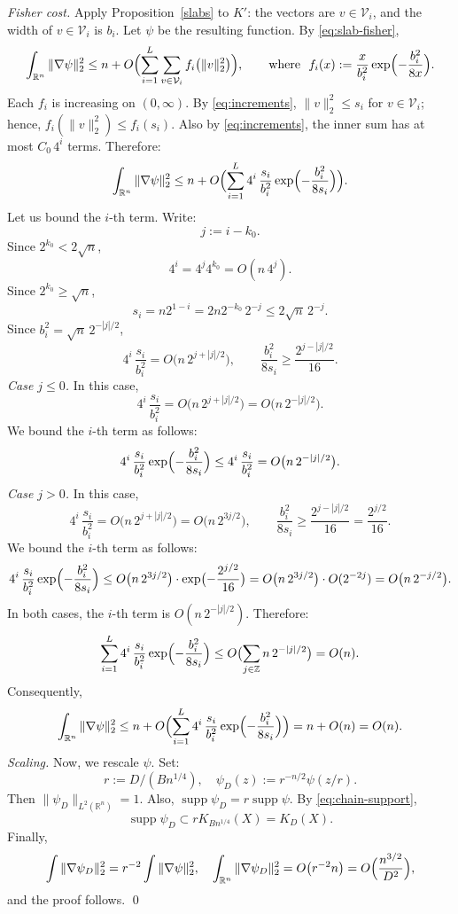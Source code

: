 \documentclass[12pt,reqno]{amsart}
\makeatletter
\renewenvironment{proof}[1][\proofname]{%
  \par\vspace{\topsep}%
  \normalfont\topsep6\p@\@plus6\p@\relax
  \trivlist
  \item[\hskip\labelsep\itshape #1\@addpunct{.}]\ignorespaces
}{%
  \endtrivlist
}
\numberwithin{equation}{section}
\def \R {\mathbb{R}}
\makeatother
\begin{document}
\begin{proof}
\emph{Fisher cost.} Apply Proposition~\ref{slabs} to \(K'\): the vectors are \(v\in\mathcal V_i\), and the width of \(v\in\mathcal V_i\) is \(b_i\). Let \(\psi\) be the resulting function. By \eqref{eq:slab-fisher},
\[
\int_{\R^n}\|\nabla\psi\|_2^2\le
n+O\Bigl(\sum_{i=1}^L\sum_{v\in\mathcal V_i}f_i\bigl(\|v\|_2^2\bigr)\Bigr),
\qquad\text{where }\ f_i(x):=\frac{x}{b_i^2}\exp\Bigl(-\frac{b_i^2}{8x}\Bigr).
\]
Each \(f_i\) is increasing on \((0,\infty)\). By \eqref{eq:increments}, \(\|v\|_2^2\le s_i\) for \(v\in\mathcal V_i\); hence, \(f_i(\|v\|_2^2)\le f_i(s_i)\). Also by \eqref{eq:increments}, the inner sum has at most \(C_0\,4^i\) terms. Therefore:
\[
\int_{\R^n}\|\nabla\psi\|_2^2\le
n+O\Bigl(\sum_{i=1}^L4^i\,\frac{s_i}{b_i^2}\exp\Bigl(-\frac{b_i^2}{8s_i}\Bigr)\Bigr).
\]
Let us bound 
the \(i\)-th term. Write: 
\[
j:=i-k_0.
\] 
Since \(2^{k_0}<2\sqrt n\), 
\[
4^{i} = 4^{j} 4^{k_0} = O(n\,4^j).
\]
Since \(2^{k_0}\ge\sqrt n\), 
\[
s_i= n 2^{1-i} = 2n2^{-k_0}\,2^{-j}\le2\sqrt n\,2^{-j}.
\]
Since \(b_i^2=\sqrt n\,2^{-|j|/2}\),
\[
4^i\,\frac{s_i}{b_i^2}=O\bigl(n\,2^{j+|j|/2}\bigr),\qquad
\frac{b_i^2}{8s_i}\ge\frac{2^{j-|j|/2}}{16}.
\]
\emph{Case \(j \le 0\).} In this case, 
\[
4^i\,\frac{s_i}{b_i^2} = 
O\bigl(n\,2^{j+|j|/2}\bigr) = 
O\bigl(n\,2^{-|j|/2}\bigr).
\]
We bound the \(i\)-th term as follows:
\[
4^i\,\frac{s_i}{b_i^2}\exp\Bigl(-\frac{b_i^2}{8s_i}\Bigr) \le 
4^i\,\frac{s_i}{b_i^2} = O\bigl(n\,2^{-|j|/2}\bigr).
\]
\emph{Case \(j > 0\).} In this case, 
\[
4^i\,\frac{s_i}{b_i^2} = 
O\bigl(n\,2^{j+|j|/2}\bigr) = 
O\bigl(n\,2^{3j/2}\bigr),\qquad 
\frac{b_i^2}{8s_i}\ge\frac{2^{j-|j|/2}}{16} = \frac{2^{j/2}}{16}.
\]
We bound the \(i\)-th term as follows:
\[
4^i\,\frac{s_i}{b_i^2}\exp\Bigl(-\frac{b_i^2}{8s_i}\Bigr) \le 
O\bigl(n\,2^{3j/2}\bigr) \cdot 
\exp\bigl(-\frac{2^{j/2}}{16}\bigr) = O\bigl(n\,2^{3j/2}\bigr) \cdot O(2^{-2j}) = O\bigl(n\,2^{-j/2}\bigr).
\]
In both cases, the \(i\)-th term is \(O(n\,2^{-|j|/2})\). Therefore:
\[
\sum_{i=1}^L4^i\,\frac{s_i}{b_i^2}\exp\Bigl(-\frac{b_i^2}{8s_i}\Bigr) \le 
O\bigl(
\sum_{j\in\mathbb Z} n\,2^{-|j|/2}
\bigr) = O(n).
\]
Consequently,
\[
\int_{\R^n}\|\nabla\psi\|_2^2\le
n+O\Bigl(\sum_{i=1}^L4^i\,\frac{s_i}{b_i^2}\exp\Bigl(-\frac{b_i^2}{8s_i}\Bigr)\Bigr) = n + O(n) = O(n).
\]
\emph{Scaling.} Now, we rescale \(\psi\). Set:
\[
r:=D/(Bn^{1/4}),\quad 
\psi_D(z):=r^{-n/2}\psi(z/r).
\]
Then \(\|\psi_D\|_{L^2(\R^n)}=1\). Also, \(\operatorname{supp}\psi_D=r\operatorname{supp}\psi\). By \eqref{eq:chain-support},
\[
\operatorname{supp}\psi_D\subset rK_{Bn^{1/4}}(X)=K_{D}(X).
\]
Finally, 
\[
\int\|\nabla\psi_D\|_2^2=r^{-2}\int\|\nabla\psi\|_2^2,\quad 
\int_{\R^n}\|\nabla\psi_D\|_2^2=O\bigl(r^{-2}n\bigr)=O\Bigl(\frac{n^{3/2}}{D^2}\Bigr),
\]
and the proof follows. \qed
\end{proof}
\end{document}
